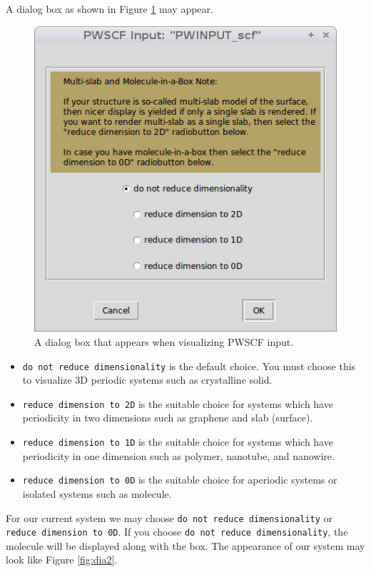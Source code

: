 \documentclass[12pt,english]{paper}
\begin{document}
A dialog box as shown in Figure \ref{fig:dia1} may appear.

\begin{figure}[H]
\noindent \begin{centering}
\includegraphics[scale=0.5]{images/RedDimens}
\par\end{centering}

\caption{A dialog box that appears when visualizing PWSCF input. \label{fig:dia1}}


\end{figure}

\begin{itemize}
\item \texttt{do not reduce dimensionality} is the default choice. You must
choose this to visualize 3D periodic systems such as crystalline solid.
\item \texttt{reduce dimension to 2D} is the suitable choice for systems
which have periodicity in two dimensions such as graphene and slab
(surface).
\item \texttt{reduce dimension to 1D} is the suitable choice for systems
which have periodicity in one dimension such as polymer, nanotube,
and nanowire.
\item \texttt{reduce dimension to 0D} is the suitable choice for aperiodic
systems or isolated systems such as molecule.
\end{itemize}
For our current system we may choose \texttt{do not reduce dimensionality}
or \texttt{reduce dimension to 0D}. If you choose \texttt{do not reduce
dimensionality}, the molecule will be displayed along with the box.
The appearance of our system may look like Figure \ref{fig:dia2}.
\end{document}
